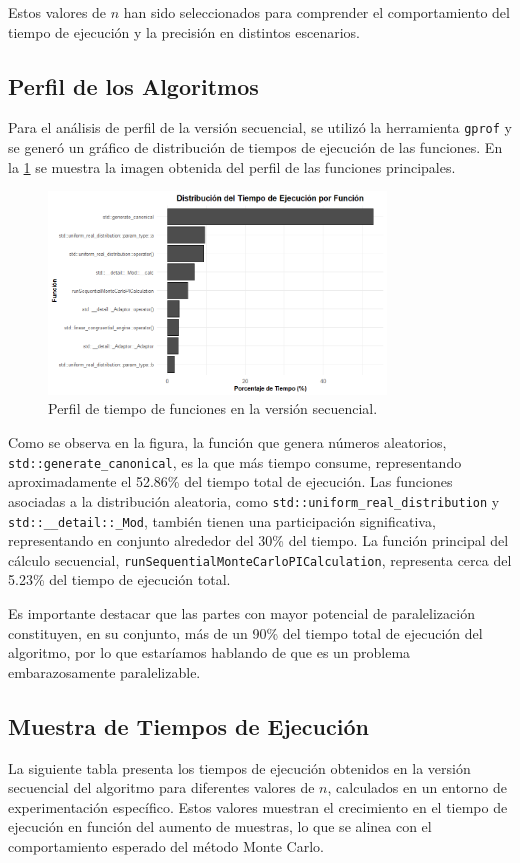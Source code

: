 \documentclass[a4paper, 10pt, onecolumn]{IEEEtran}
\begin{document}
Estos valores de $n$ han sido seleccionados para comprender el comportamiento del tiempo de ejecución y la precisión en distintos escenarios.

\subsection{Perfil de los Algoritmos}
Para el análisis de perfil de la versión secuencial, se utilizó la herramienta \texttt{gprof} y se generó un gráfico de distribución de tiempos de ejecución de las funciones. En la \cref{fig:sec_profile} se muestra la imagen obtenida del perfil de las funciones principales.

\begin{figure}[H]
  \centering
  \includegraphics[width=0.8\textwidth]{./img/secuencial.png}
  \caption{Perfil de tiempo de funciones en la versión secuencial.}
  \label{fig:sec_profile}
\end{figure}

Como se observa en la figura, la función que genera números aleatorios, \texttt{std::generate\_canonical}, es la que más tiempo consume, representando aproximadamente el 52.86\% del tiempo total de ejecución. Las funciones asociadas a la distribución aleatoria, como \texttt{std::uniform\_real\_distribution} y \texttt{std::\_\_detail::\_Mod}, también tienen una participación significativa, representando en conjunto alrededor del 30\% del tiempo. La función principal del cálculo secuencial, \texttt{runSequentialMonteCarloPICalculation}, representa cerca del 5.23\% del tiempo de ejecución total.

Es importante destacar que las partes con mayor potencial de paralelización constituyen, en su conjunto, más de un 90\% del tiempo total de ejecución del algoritmo, por lo que estaríamos hablando de que es un problema embarazosamente paralelizable.

\subsection{Muestra de Tiempos de Ejecución}
La siguiente tabla presenta los tiempos de ejecución obtenidos en la versión secuencial del algoritmo para diferentes valores de $n$, calculados en un entorno de experimentación específico. Estos valores muestran el crecimiento en el tiempo de ejecución en función del aumento de muestras, lo que se alinea con el comportamiento esperado del método Monte Carlo.
\end{document}

